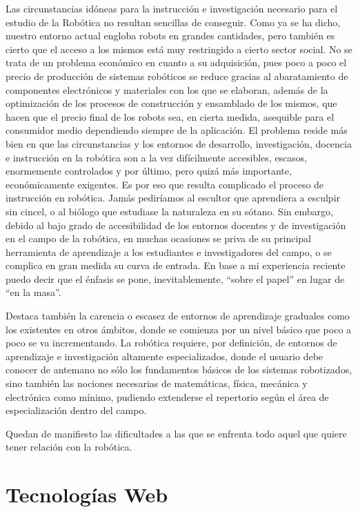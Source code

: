 Las circunstancias idóneas para la instrucción e investigación necesario para el estudio de la Robótica no resultan sencillas de conseguir. Como ya se ha dicho, nuestro entorno actual engloba robots en grandes cantidades, pero también es cierto que el acceso a los mismos está muy restringido a cierto sector social. No se trata de un problema económico en cuanto a su adquisición, pues poco a poco el precio de producción de sistemas robóticos se reduce gracias al abaratamiento de componentes electrónicos y materiales con los que se elaboran, además de la optimización de los procesos de construcción y ensamblado de los mismos, que hacen que el precio final de los robots sea, en cierta medida, asequible para el consumidor medio dependiendo siempre de la aplicación. El problema reside más bien en que las circunstancias y los entornos de desarrollo, investigación, docencia e instrucción en la robótica son a la vez difícilmente accesibles, escasos, enormemente controlados y por último, pero quizá más importante, económicamente exigentes. Es por eso que resulta complicado el proceso de instrucción en robótica. Jamás pediríamos al escultor que aprendiera a esculpir sin cincel, o al biólogo que estudiase la naturaleza en su sótano. Sin embargo, debido al bajo grado de accesibilidad de los entornos docentes y de investigación en el campo de la robótica, en muchas ocasiones se priva de su principal herramienta de aprendizaje a los estudiantes e investigadores del campo, o se complica en gran medida su curva de entrada. En base a mi experiencia reciente puedo decir que el énfasis se pone, inevitablemente, ``sobre el papel'' en lugar de ``en la masa''.

Destaca también la carencia o escasez de entornos de aprendizaje graduales como los existentes en otros ámbitos, donde se comienza por un nivel básico que poco a poco se va incrementando. La robótica requiere, por definición, de entornos de aprendizaje e investigación altamente especializados, donde el usuario debe conocer de antemano no sólo los fundamentos básicos de los sistemas robotizados, sino también las nociones necesarias de matemáticas, física, mecánica y electrónica como mínimo, pudiendo extenderse el repertorio según el área de especialización dentro del campo.

Quedan de manifiesto las dificultades a las que se enfrenta todo aquel que quiere tener relación con la robótica.

\section{Tecnologías Web}

